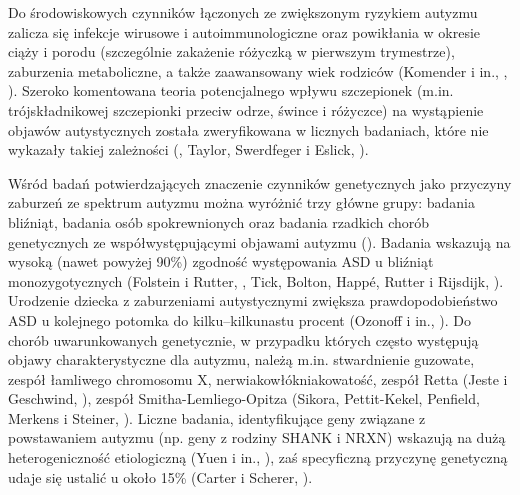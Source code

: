     Do środowiskowych czynników łączonych ze zwiększonym ryzykiem autyzmu zalicza się infekcje wirusowe i autoimmunologiczne oraz powikłania w okresie ciąży i porodu (szczególnie zakażenie różyczką w pierwszym trymestrze), zaburzenia metaboliczne, a także zaawansowany wiek rodziców (Komender i in., \cite*{komender2012autyzm}, \cite{frith2008autyzm}).
    Szeroko komentowana teoria potencjalnego wpływu szczepionek (m.in. trójskładnikowej szczepionki przeciw odrze, śwince i różyczce) na wystąpienie objawów autystycznych została zweryfikowana w licznych badaniach, które nie wykazały takiej zależności (\cite{frith2008autyzm}, Taylor, Swerdfeger i Eslick, \cite*{taylor2014vaccines}).
    
    Wśród badań potwierdzających znaczenie czynników genetycznych jako przyczyny zaburzeń ze spektrum autyzmu można wyróżnić trzy główne grupy: badania bliźniąt, badania osób spokrewnionych oraz badania rzadkich chorób genetycznych ze współwystępującymi objawami autyzmu (\cite{geschwind2011genetics}).
    Badania wskazują na wysoką (nawet powyżej 90\%) zgodność występowania ASD u bliźniąt monozygotycznych (Folstein i Rutter, \cite*{folstein1977infantile}, Tick, Bolton, Happ{\'e}, Rutter i Rijsdijk, \cite*{tick2016heritability}).
    Urodzenie dziecka z zaburzeniami autystycznymi zwiększa prawdopodobieństwo ASD u kolejnego potomka do kilku--kilkunastu procent (Ozonoff i in., \cite*{ozonoff2011recurrence}).
    Do chorób uwarunkowanych genetycznie, w przypadku których często występują objawy charakterystyczne dla autyzmu, należą m.in. stwardnienie guzowate, zespół łamliwego chromosomu X, nerwiakowłókniakowatość, zespół Retta (Jeste i Geschwind, \cite*{jeste2014disentangling}), zespół Smitha-Lemliego-Opitza (Sikora, Pettit-Kekel, Penfield, Merkens i Steiner, \cite*{sikora2006near}).
    Liczne badania, identyfikujące geny związane z powstawaniem autyzmu (np. geny z rodziny SHANK i NRXN) wskazują na dużą heterogeniczność etiologiczną (Yuen i in., \cite*{yuen2017whole}), zaś specyficzną przyczynę genetyczną udaje się ustalić u około 15\% (Carter i Scherer, \cite*{carter2013autism}). 
    
